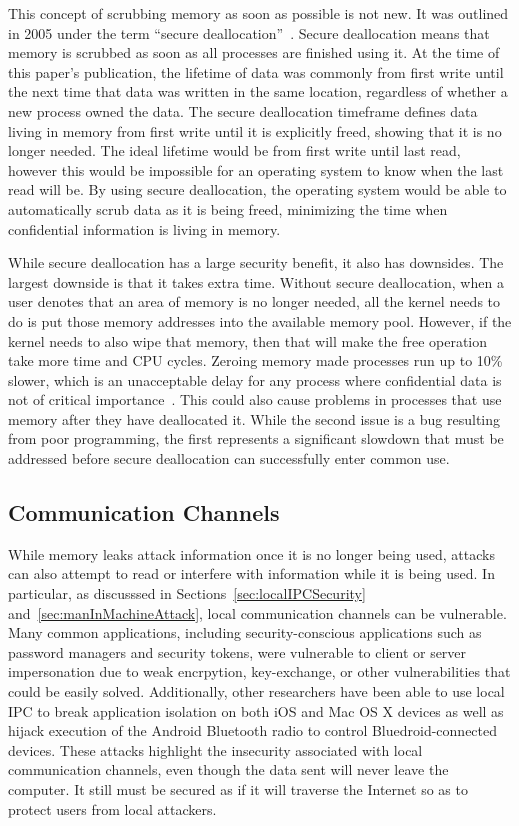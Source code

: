 This concept of scrubbing memory as soon as possible is not new.  It was outlined in 2005 under the term ``secure deallocation''~\cite{chow2005shredding}.  Secure deallocation means that memory is scrubbed as soon as all processes are finished using it.  At the time of this paper's publication, the lifetime of data was commonly from first write until the next time that data was written in the same location, regardless of whether a new process owned the data.  The secure deallocation timeframe defines data living in memory from first write until it is explicitly freed, showing that it is no longer needed.  The ideal lifetime would be from first write until last read, however this would be impossible for an operating system to know when the last read will be.  By using secure deallocation, the operating system would be able to automatically scrub data as it is being freed, minimizing the time when confidential information is living in memory.

While secure deallocation has a large security benefit, it also has downsides.  The largest downside is that it takes extra time.  Without secure deallocation, when a user denotes that an area of memory is no longer needed, all the kernel needs to do is put those memory addresses into the available memory pool.  However, if the kernel needs to also wipe that memory, then that will make the free operation take more time and CPU cycles.  Zeroing memory made processes run up to 10\% slower, which is an unacceptable delay for any process where confidential data is not of critical importance~\cite{chow2005shredding}.  This could also cause problems in processes that use memory after they have deallocated it.  While the second issue is a bug resulting from poor programming, the first represents a significant slowdown that must be addressed before secure deallocation can successfully enter common use.

\subsection{Communication Channels}
\label{sec:communicationChannels}
While memory leaks attack information once it is no longer being used, attacks can also attempt to read or interfere with information while it is being used.  In particular, as discusssed in Sections~\ref{sec:localIPCSecurity} and~\ref{sec:manInMachineAttack}, local communication channels can be vulnerable.  Many common applications, including security-conscious applications such as password managers and security tokens, were vulnerable to client or server impersonation due to weak encrpytion, key-exchange, or other vulnerabilities that could be easily solved.  Additionally, other researchers have been able to use local IPC to break application isolation on both iOS and Mac OS X devices as well as hijack execution of the Android Bluetooth radio to control Bluedroid-connected devices.  These attacks highlight the insecurity associated with local communication channels, even though the data sent will never leave the computer.  It still must be secured as if it will traverse the Internet so as to protect users from local attackers.

